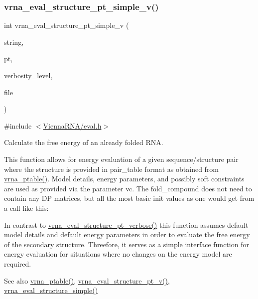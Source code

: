 \subsubsection{\texorpdfstring{vrna\_eval\_structure\_pt\_simple\_v()}{vrna\_eval\_structure\_pt\_simple\_v()}}
{\footnotesize\ttfamily int vrna\+\_\+eval\+\_\+structure\+\_\+pt\+\_\+simple\+\_\+v (\begin{DoxyParamCaption}\item[{const char $\ast$}]{string,  }\item[{const short $\ast$}]{pt,  }\item[{int}]{verbosity\+\_\+level,  }\item[{F\+I\+LE $\ast$}]{file }\end{DoxyParamCaption})}



{\ttfamily \#include $<$\mbox{\hyperlink{eval_8h}{Vienna\+R\+N\+A/eval.\+h}}$>$}



Calculate the free energy of an already folded R\+NA. 

This function allows for energy evaluation of a given sequence/structure pair where the structure is provided in pair\+\_\+table format as obtained from \mbox{\hyperlink{group__struct__utils__pair__table_gae829fb8bb7f694c12a9c0bbc34c77c60}{vrna\+\_\+ptable()}}. Model details, energy parameters, and possibly soft constraints are used as provided via the parameter \textquotesingle{}vc\textquotesingle{}. The fold\+\_\+compound does not need to contain any DP matrices, but all the most basic init values as one would get from a call like this\+: 
\begin{DoxyCode}{0}
\end{DoxyCode}
 In contrast to \mbox{\hyperlink{group__eval_ga8a517cfeeae8c376ae7b1e0c401d38b4}{vrna\+\_\+eval\+\_\+structure\+\_\+pt\+\_\+verbose()}} this function assumes default model details and default energy parameters in order to evaluate the free energy of the secondary structure. Threefore, it serves as a simple interface function for energy evaluation for situations where no changes on the energy model are required.

\begin{DoxySeeAlso}{See also}
\mbox{\hyperlink{group__struct__utils__pair__table_gae829fb8bb7f694c12a9c0bbc34c77c60}{vrna\+\_\+ptable()}}, \mbox{\hyperlink{group__eval_ga2c6533ba0afe4c88d335d8f1e0e2a48e}{vrna\+\_\+eval\+\_\+structure\+\_\+pt\+\_\+v()}}, \mbox{\hyperlink{group__eval_ga7e5273464b775d4130245681312c1369}{vrna\+\_\+eval\+\_\+structure\+\_\+simple()}}
\end{DoxySeeAlso}

